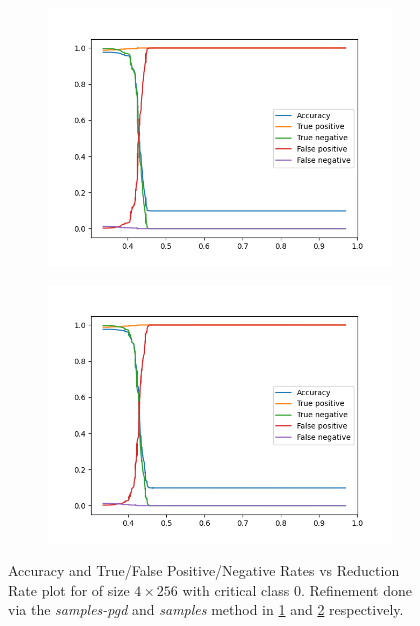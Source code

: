 \begin{figure}
    \begin{subfigure}{0.475\linewidth}
        \includegraphics[scale=0.275]{figs/mnist-compr-4-256-samples.png}
        \caption{}
        \label{f:mnist-compr-samples}
    \end{subfigure}
    \begin{subfigure}{0.475\linewidth}
        \includegraphics[scale=0.275]{figs/mnist-compr-4-256-pgd-after-samples.png}
        \caption{}
        \label{f:mnist-compr-samples-pgd}
    \end{subfigure}
    \caption{Accuracy and True/False Positive/Negative Rates vs Reduction Rate
        plot for \mnist of size $4 \times 256$ with critical class 0. Refinement
    done via the \textit{samples-pgd} and \textit{samples} method in
    \ref{f:mnist-compr-samples} and \ref{f:mnist-compr-samples-pgd} 
    respectively. }
    \label{f:mnist-class}
\end{figure}


